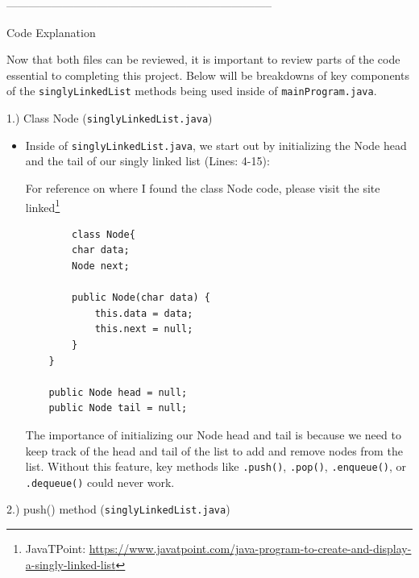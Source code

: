 \documentclass[a4paper,12pt]{article}
\begin{document}
\begin{center}
    -----------------------------------------------------------------------
\end{center}

\begin{center}
\begin{large}
    Code Explanation
\end{large}
\end{center}

Now that both files can be reviewed, it is important to review parts of the code essential to completing this project. Below will be breakdowns of key components of the \verb|singlyLinkedList| methods being used inside of \verb|mainProgram.java|.

\pagebreak
 
\begin{large}
    1.) Class Node (\verb|singlyLinkedList.java|)
\end{large}


\begin{itemize}
\item Inside of \verb|singlyLinkedList.java|, we start out by initializing the Node head and the tail of our singly linked list (Lines: 4-15):

\begin{footnotesize}
For reference on where I found the class Node code, please visit the site linked\footnote{JavaTPoint: \url{https://www.javatpoint.com/java-program-to-create-and-display-a-singly-linked-list}} 
\end{footnotesize}
\begin{verbatim}
        class Node{    
        char data;    
        Node next;    
            
        public Node(char data) {    
            this.data = data;    
            this.next = null;    
        }    
    }    
    
    public Node head = null;    
    public Node tail = null;  
\end{verbatim}
The importance of initializing our Node head and tail is because we need to keep track of the head and tail of the list to add and remove nodes from the list. Without this feature, key methods like \verb|.push()|, \verb|.pop()|, \verb|.enqueue()|, or \verb|.dequeue()| could never work. \\

\end{itemize}

\begin{large}
    2.) push() method (\verb|singlyLinkedList.java|)
\end{large}
\end{document}
